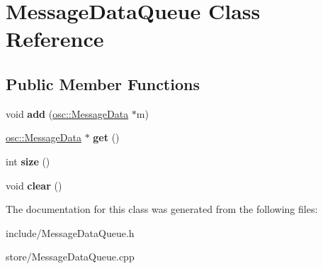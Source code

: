 \hypertarget{classMessageDataQueue}{}\section{Message\+Data\+Queue Class Reference}
\label{classMessageDataQueue}
\subsection*{Public Member Functions}
\begin{DoxyCompactItemize}
\item 
void {\bfseries add} (\hyperlink{classosc_1_1MessageData}{osc\+::\+Message\+Data} $\ast$m)\hypertarget{classMessageDataQueue_a8d2d0c5e6b879c240a5845b2c789c130}{}\label{classMessageDataQueue_a8d2d0c5e6b879c240a5845b2c789c130}

\item 
\hyperlink{classosc_1_1MessageData}{osc\+::\+Message\+Data} $\ast$ {\bfseries get} ()\hypertarget{classMessageDataQueue_ae1829552864a18207ca556edcb82a76d}{}\label{classMessageDataQueue_ae1829552864a18207ca556edcb82a76d}

\item 
int {\bfseries size} ()\hypertarget{classMessageDataQueue_a6f7619c03371e76b95a2c2d348da866d}{}\label{classMessageDataQueue_a6f7619c03371e76b95a2c2d348da866d}

\item 
void {\bfseries clear} ()\hypertarget{classMessageDataQueue_a565232895a0e0cc0416715aedf2e5e21}{}\label{classMessageDataQueue_a565232895a0e0cc0416715aedf2e5e21}

\end{DoxyCompactItemize}


The documentation for this class was generated from the following files\+:\begin{DoxyCompactItemize}
\item 
include/Message\+Data\+Queue.\+h\item 
store/Message\+Data\+Queue.\+cpp\end{DoxyCompactItemize}
